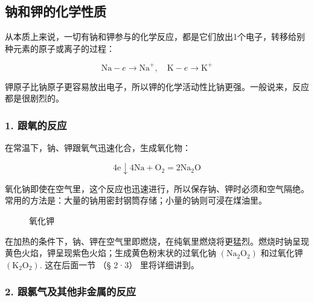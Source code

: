 \subsection{钠和钾的化学性质}

从本质上来说，一切有钠和钾参与的化学反应，都是它们放出1个电子，转移给别种元素的原子或离子的过程：

\[
\mathrm{Na} - e \longrightarrow \mathrm{Na} ^ {+}, \quad \mathrm{K} - e \longrightarrow \mathrm{K} ^ {+}
\]

钾原子比钠原子更容易放出电子，所以钾的化学活动性比钠更强。一般说来，反应都是很剧烈的。

\subsubsection{1. 跟氧的反应}

在常温下，钠、钾跟氧气迅速化合，生成氧化物：

\[
4 \mathrm{e} \downarrow 4 \mathrm{Na} + \mathrm{O} _ {2} = 2 \mathrm{Na} _ {2} \mathrm{O}
\]

氧化钠即使在空气里，这个反应也迅速进行，所以保存钠、钾时必须和空气隔绝。常用的方法是：大量的钠用密封钢筒存储；小量的钠则可浸在煤油里。

\begin{figure}
\centering
{}
\caption{氧化钾}
\end{figure}

在加热的条件下，钠、钾在空气里即燃烧，在纯氧里燃烧将更猛烈。燃烧时钠呈现黄色火焰，钾呈现紫色火焰；生成黄色粉末状的过氧化钠
\(\left(\mathrm{Na}_{2} \mathrm{O}_{2}\right)\) 和过氧化钾
\(\left(\mathrm{K}_{2} \mathrm{O}_{2}\right)\). 这在后面一节 （§ 2·3）
里将详细讲到。

\subsubsection{2. 跟氯气及其他非金属的反应}

